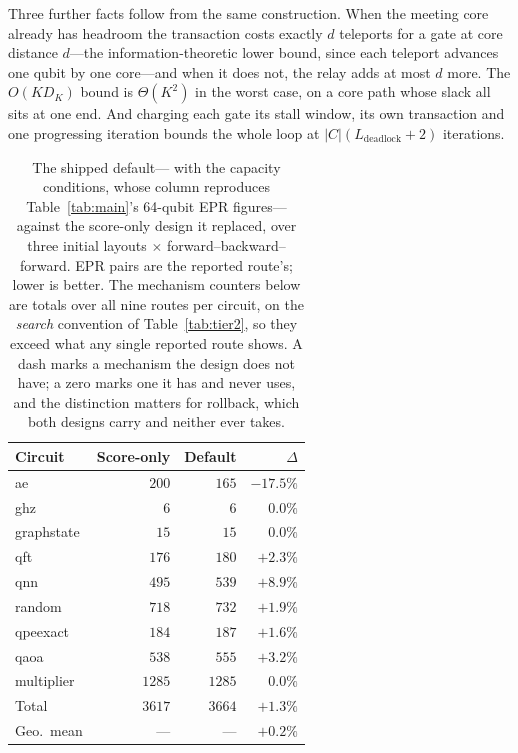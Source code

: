Three further facts follow from the same construction.  When the meeting core
already has headroom the transaction costs exactly $d$ teleports for a gate at
core distance $d$---the information-theoretic lower bound, since each teleport
advances one qubit by one core---and when it does not, the relay adds at most
$d$ more.  The $O(KD_K)$ bound is $\Theta(K^2)$ in the worst case, on a core
path whose slack all sits at one end.  And charging each gate its stall window,
its own transaction and one progressing iteration bounds the whole loop at
$|C|(L_\mathrm{deadlock}{+}2)$ iterations.



\begin{table}[t]
\centering
\caption{The shipped default---\dSABRE{} with the capacity
conditions, whose column reproduces Table~\ref{tab:main}'s 64-qubit EPR
figures---against the score-only design it replaced, over three initial
layouts $\times$ forward--backward--forward.  EPR pairs are the reported
route's; lower is better.  The mechanism counters below are totals over all
nine routes per circuit, on the \emph{search} convention of
Table~\ref{tab:tier2}, so they exceed what any single reported route shows.
A dash marks a mechanism the design does not have; a zero marks one it has and
never uses, and the distinction matters for rollback, which both designs
carry and neither ever takes.}
\label{tab:safemode}
\small
\setlength{\tabcolsep}{5pt}
\begin{tabular}{@{}lrrr@{}}
\toprule
Circuit & Score-only & Default & $\Delta$ \\
\midrule
ae          & $200$   & $165$   & $-17.5\%$ \\
ghz         & $6$     & $6$     & $0.0\%$   \\
graphstate  & $15$    & $15$    & $0.0\%$   \\
qft         & $176$   & $180$   & $+2.3\%$  \\
qnn         & $495$   & $539$   & $+8.9\%$  \\
random      & $718$   & $732$   & $+1.9\%$  \\
qpeexact    & $184$   & $187$   & $+1.6\%$  \\
qaoa        & $538$   & $555$   & $+3.2\%$  \\
multiplier  & $1285$  & $1285$  & $0.0\%$   \\
\midrule
Total       & $3617$  & $3664$  & $+1.3\%$  \\
Geo.\ mean  & ---     & ---     & $+0.2\%$  \\

\end{tabular}
\end{table}
